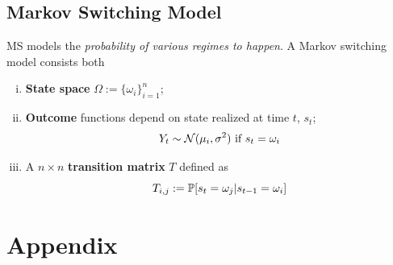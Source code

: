 \documentclass[11pt]{article}
\begin{document}
		\subsection{Markov Switching Model}
			\begin{definition}
				MS models the \emph{probability of various regimes to happen}. A Markov switching model consists both
				\begin{enumerate}[(i)]
					\item \textbf{State space} $\Omega := \{\omega_i\}_{i=1}^n$;
					\item \textbf{Outcome} functions depend on state realized at time $t$, $s_t$;
						\begin{equation}
							Y_t \sim \mathcal{{N}}(\mu_i, \sigma^2) \text{{ if }} s_t = \omega_i
						\end{equation}
					\item A $n \times n$ \textbf{transition matrix} $T$ defined as
					\begin{equation}
						T_{i, j} := \mathbb{P}[{s_t = \omega_j|s_{t-1} = \omega_i}] 
					\end{equation}
				\end{enumerate}
			\end{definition}
			
	\section{Appendix}
\end{document}

